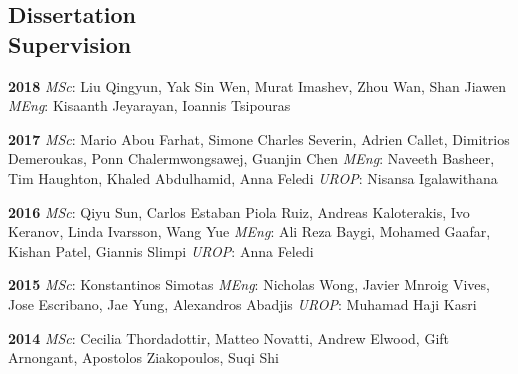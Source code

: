 \documentclass[margin]{res}
\begin{document}
\begin{resume}
\section{\sc Dissertation \\ Supervision}
\vspace{0.15in}
	\parskip=0in
	\hangindent=0.45in
	{\bf2018 }
		\textit{MSc}: Liu Qingyun, Yak Sin Wen, Murat Imashev, Zhou Wan, Shan Jiawen 
			{}
		\textit{MEng}: Kisaanth Jeyarayan, Ioannis Tsipouras 
	\par
	\parskip=0in
	\hangindent=0.45in
	{\bf2017 }
		\textit{MSc}: Mario Abou Farhat, Simone Charles Severin, Adrien Callet, Dimitrios Demeroukas, Ponn Chalermwongsawej, Guanjin Chen 
			{}
		\textit{MEng}: Naveeth Basheer, Tim Haughton, Khaled Abdulhamid, Anna Feledi 
			{ }
		\textit{UROP}: Nisansa Igalawithana 
	\par
	\parskip=0in
	\hangindent=0.45in
	{\bf2016 }
		\textit{MSc}: Qiyu Sun, Carlos Estaban Piola Ruiz, Andreas Kaloterakis, Ivo Keranov, Linda Ivarsson, Wang Yue 
			{}
		\textit{MEng}: Ali Reza Baygi, Mohamed Gaafar, Kishan Patel, Giannis Slimpi 
			{ }
		\textit{UROP}: Anna Feledi 
	\par
	\parskip=0in
	\hangindent=0.45in
	{\bf2015 }
		\textit{MSc}: Konstantinos Simotas 
			{}
		\textit{MEng}: Nicholas Wong, Javier Mnroig Vives, Jose Escribano, Jae Yung, Alexandros Abadjis 
			{ }
		\textit{UROP}: Muhamad Haji Kasri 
	\par
	\parskip=0in
	\hangindent=0.45in
	{\bf2014 }
		\textit{MSc}: Cecilia Thordadottir, Matteo Novatti, Andrew Elwood, Gift Arnongant, Apostolos Ziakopoulos, Suqi Shi 

\end{resume}
\end{document}
